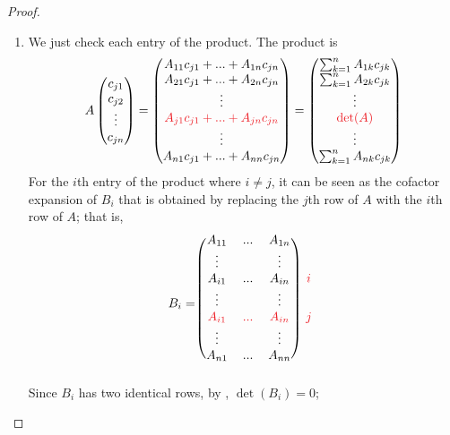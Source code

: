 \begin{proof}
\begin{enumerate}
\item We just check each entry of the product.
The product is
\begin{equation} \label{exec.4.3.25.eq}
    A \begin{pmatrix} c_{j1} \\ c_{j2} \\ \vdots \\ c_{jn} \end{pmatrix}
    = \begin{pmatrix}
        A_{11} c_{j1} + ... + A_{1n} c_{jn} \\
        A_{21} c_{j1} + ... + A_{2n} c_{jn} \\
        \vdots \\
        \RED{A_{j1} c_{j1} + ... + A_{jn} c_{jn}} \\
        \vdots \\
        A_{n1} c_{j1} + ... + A_{nn} c_{jn}
    \end{pmatrix}
    = \begin{pmatrix}
        \sum_{k = 1}^n A_{1k} c_{jk} \\
        \sum_{k = 1}^n A_{2k} c_{jk} \\
        \vdots \\
        \RED{\det(A)} \\
        \vdots \\
        \sum_{k = 1}^n A_{nk} c_{jk}
    \end{pmatrix}
\end{equation}
For the \(i\)th entry of the product where \(i \ne j\), it can be seen as the cofactor expansion of \(B_i\) that is obtained by replacing the \(j\)th row of \(A\) with the \(i\)th row of \(A\);
that is,
\[
    B_i = \begin{blockarray}{cccc}
        \begin{block}{(ccc)c}
        A_{11} & ... & A_{1n} & \\
        \vdots &     & \vdots & \\
        A_{i1} & ... & A_{in} & \RED{i} \\
        \vdots &     & \vdots & \\
        \RED{A_{i1}} & \RED{...} & \RED{A_{in}} & \RED{j}\\
        \vdots &     & \vdots & \\
        A_{n1} & ... & A_{nn} & \\
        \end{block}
    \end{blockarray}
\]
Since \(B_i\) has two identical rows, by , \(\det(B_i) = 0\);

\end{enumerate}
\end{proof}
